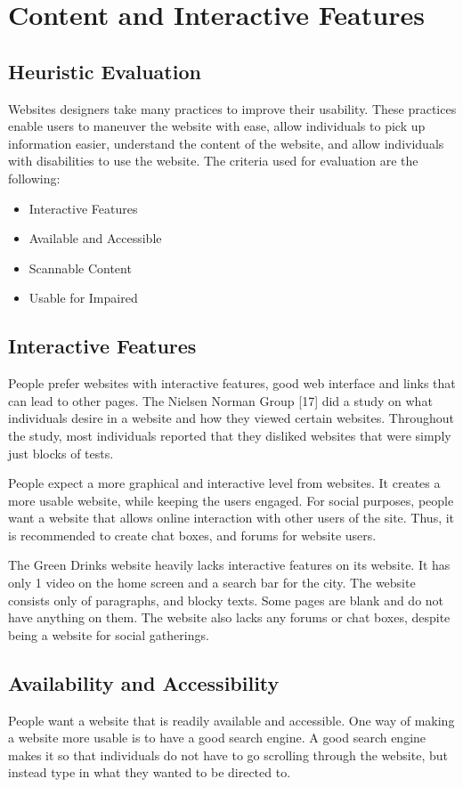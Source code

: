 \documentclass[12pt]{article}
\begin{document}
\section{Content and Interactive Features}
\subsection{Heuristic Evaluation}
Websites designers take many practices to improve their usability. These practices enable users to maneuver the website with ease, allow individuals to pick up information easier, understand the content of the website, and allow individuals with disabilities to use the website. The criteria used for evaluation are the following:
\begin{itemize}
\item Interactive Features
\item Available and Accessible
\item	Scannable Content
\item	Usable for Impaired
\end{itemize}


\subsection*{Interactive Features}
People prefer websites with interactive features, good web interface and links that can lead to other pages. The Nielsen Norman Group [17] did a study on what individuals desire in a website and how they viewed certain websites. Throughout the study, most individuals reported that they disliked websites that were simply just blocks of tests. 

People expect a more graphical and interactive level from websites. It creates a more usable website, while keeping the users engaged. For social purposes, people want a website that allows online interaction with other users of the site. Thus, it is recommended to create chat boxes, and forums for website users.

The Green Drinks website heavily lacks interactive features on its website. It has only 1 video on the home screen and a search bar for the city. The website consists only of paragraphs, and blocky texts. Some pages are blank and do not have anything on them. The website also lacks any forums or chat boxes, despite being a website for social gatherings.

\subsection*{Availability and Accessibility}
People want a website that is readily available and accessible. One way of making a website more usable is to have a good search engine. A good search engine makes it so that individuals do not have to go scrolling through the website, but instead type in what they wanted to be directed to. 
\end{document}

